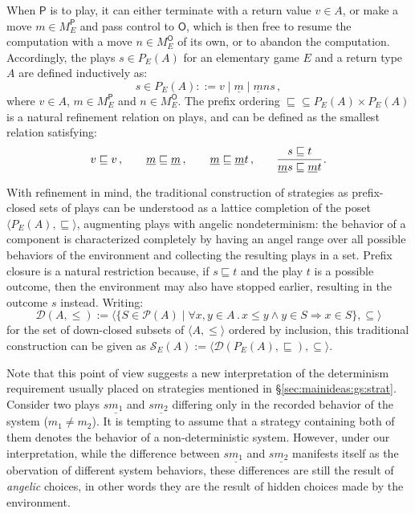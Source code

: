 \documentclass[format=sigplan,authordraft]{acmart}
\newcommand{\kw}[1]{\ensuremath{\mathsf{#1}}}
\begin{document}
When $\kw{P}$ is to play,
it can either terminate with a return value $v \in A$,
or make a move $m \in M_E^\kw{P}$ and pass control to $\kw{O}$,
which is then free to resume the computation with
a move $n \in M_E^\kw{O}$ of its own,
or to abandon the computation.
Accordingly,
the plays $s \in P_E(A)$
for an elementary game $E$ and a return type $A$
are defined inductively as:
\[
  s \in P_E(A) ::= v \mid \underline{m} \mid \underline{m} ns \,,
\]
where $v \in A$, $m \in M_E^\kw{P}$ and $n \in M_E^\kw{O}$.
The prefix ordering
${\sqsubseteq} \subseteq P_E(A) \times P_E(A)$
is a natural refinement relation on plays,
and can be defined
as the smallest relation satisfying:
\[
  v \sqsubseteq v \,, \qquad
  \underline{m} \sqsubseteq \underline{m} \,, \qquad
  \underline{m} \sqsubseteq \underline{m}t \,, \qquad
  \begin{prooftree}
    \hypo{s \sqsubseteq t}
    \infer1{\underline{m}s \sqsubseteq \underline{m}t}
  \end{prooftree} \,.
\]

With refinement in mind,
the traditional construction of strategies
as prefix-closed sets of plays
can be understood as a lattice completion of the poset
$\langle P_E(A), {\sqsubseteq} \rangle$,
augmenting plays with angelic nondeterminism:
the behavior of a component is characterized completely
by having an angel range over all possible behaviors of the environment
and collecting the resulting plays in a set.
Prefix closure is a natural restriction because,
if $s \sqsubseteq t$ and the play $t$ is a possible outcome,
then the environment may also have stopped earlier,
resulting in the outcome $s$ instead.
Writing:
\[
  \mathcal{D}(A, {\le}) :=
    \langle
    \{ S \in \mathcal{P}(A) \mid
        \forall x, y \in A \,.\,
           x \le y \wedge y \in S \Rightarrow x \in S \},
    {\subseteq}
    \rangle
\]
for the set of down-closed subsets of $\langle A, {\le} \rangle$
ordered by inclusion,
this traditional construction can be given as
$\mathcal{S}_E(A) :=
\langle \mathcal{D}(P_E(A), {\sqsubseteq}), {\subseteq} \rangle$.

Note that this point of view suggests a new interpretation
of the determinism requirement usually placed on strategies
mentioned in \S\ref{sec:mainideas:gs:strat}.
Consider
two plays $s\underline{m_1}$ and $s\underline{m_2}$
differing only in the recorded behavior of the system
($m_1 \neq m_2$).
It is tempting to assume that
a strategy containing both of them
denotes the behavior of a non-deterministic system.
However,
under our interpretation,
while the difference between $s\underline{m_1}$ and $s\underline{m_2}$
manifests itself as the obervation of different system behaviors,
these differences are still the result of \emph{angelic} choices,
in other words they are the result of hidden choices made by the
environment.
\end{document}
